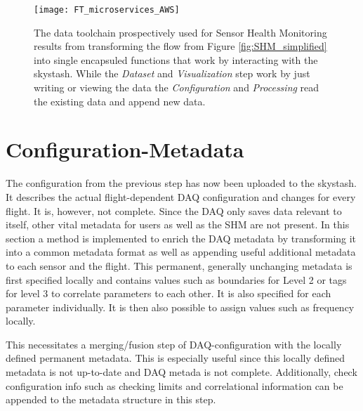 \begin{figure}[h]
    \centering
    \texttt{[image: FT\_microservices\_AWS]}
    \caption[SHM representation as microservices]{The data toolchain prospectively used for Sensor Health Monitoring results from transforming the flow from Figure \ref{fig:SHM_simplified} into single encapsuled functions that work by interacting with the skystash. While the \textit{Dataset} and \textit{Visualization} step work by just writing or viewing the data the \textit{Configuration} and \textit{Processing} read the existing data and append new data.}
    \label{fig:fti_microservices}
\end{figure}




\section{Configuration-Metadata}

The configuration from the previous step has now been uploaded to the skystash. It describes the actual flight-dependent DAQ configuration and changes for every flight. It is, however, not complete. Since the DAQ only saves data relevant to itself, other vital metadata for users as well as the SHM are not present. In this section a method is implemented to enrich the DAQ metadata by transforming it into a common metadata format as well as appending useful additional metadata to each sensor and the flight.
This permanent, generally unchanging metadata is first specified locally and contains values such as boundaries for Level 2 or tags for level 3 to correlate parameters to each other. It is also specified for each parameter individually. It is then also possible to assign values such as frequency locally.

This necessitates a merging/fusion step of DAQ-configuration with the locally defined permanent metadata. This is especially useful since this locally defined metadata is not up-to-date and DAQ metada is not complete. Additionally, check configuration info such as checking limits and correlational information can be appended to the metadata structure in this step.

